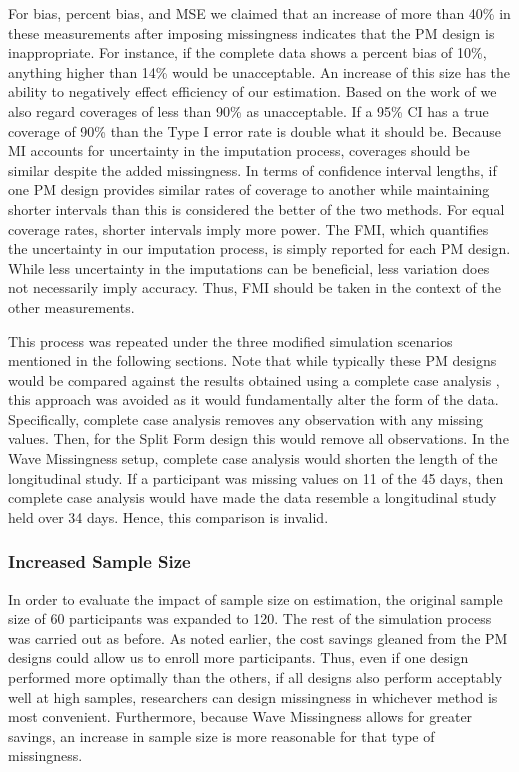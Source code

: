 \documentclass{svjour3}\usepackage[]{graphicx}\usepackage[]{color}
\begin{document}
For bias, percent bias, and MSE we claimed that an increase of more than 40\% in these measurements after imposing missingness indicates that the PM design is inappropriate. For instance, if the complete data shows a percent bias of 10\%, anything higher than 14\% would be unacceptable. An increase of this size has the ability to negatively effect efficiency of our estimation. Based on the work of \citet{collins2001comparison} we also regard coverages of less than 90\% as unacceptable. If a 95\% CI has a true coverage of 90\% than the Type I error rate is double what it should be. Because MI accounts for uncertainty in the imputation process, coverages should be similar despite the added missingness. In terms of confidence interval lengths, if one PM design provides similar rates of coverage to another while maintaining shorter intervals than this is considered the better of the two methods. For equal coverage rates, shorter intervals imply more power. The FMI, which quantifies the uncertainty in our imputation process, is simply reported for each PM design. While less uncertainty in the imputations can be beneficial, less variation does not necessarily imply accuracy. Thus, FMI should be taken in the context of the other measurements. \par

This process was repeated under the three modified simulation scenarios mentioned in the following sections. Note that while typically these PM designs would be compared against the results obtained using a complete case analysis \citep{rhemtulla2016asymptotic}, this approach was avoided as it would fundamentally alter the form of the data. Specifically, complete case analysis removes any observation with any missing values. Then, for the Split Form design this would remove all observations. In the Wave Missingness setup, complete case analysis would shorten the length of the longitudinal study. If a participant was missing values on 11 of the 45 days, then complete case analysis would have made the data resemble a longitudinal study held over 34 days. Hence, this comparison is invalid. \par

\subsubsection{Increased Sample Size}
In order to evaluate the impact of sample size on estimation, the original sample size of 60 participants was expanded to 120. The rest of the simulation process was carried out as before. As noted earlier, the cost savings gleaned from the PM designs could allow us to enroll more participants. Thus, even if one design performed more optimally than the others, if all designs also perform acceptably well at high samples, researchers can design missingness in whichever method is most convenient. Furthermore, because Wave Missingness allows for greater savings, an increase in sample size is more reasonable for that type of missingness. \par
\end{document}
